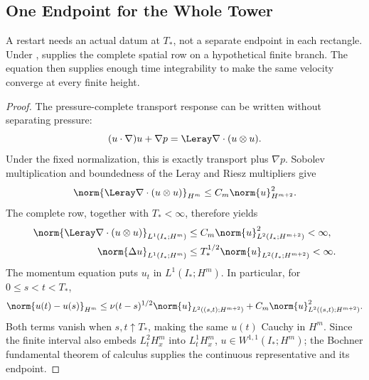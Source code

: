 \subsection{One Endpoint for the Whole Tower}\label{sub:OneEndpointForTheWholeTower}

A restart needs an actual datum at \(T_*\), not a separate endpoint in each
rectangle.  Under ,
 supplies the complete
spatial row on a hypothetical finite branch.  The equation then supplies
enough time integrability to make the same velocity converge at every finite
height.


\begin{proof}
The pressure-complete transport response can be written without separating
pressure:
\[
  (u\cdot\nabla)u+\nabla p
  =\Leray\nabla\cdot(u\otimes u).
\]
Under the fixed normalization, this is exactly transport plus \(\nabla p\).
Sobolev multiplication and boundedness of the Leray and Riesz multipliers give
\[
  \norm{\Leray\nabla\cdot(u\otimes u)}_{H^m}
  \leq
  C_m\norm{u}_{H^{m+2}}^2.
\]
The complete row, together with \(T_*<\infty\), therefore yields
\begin{align*}
  \norm{\Leray\nabla\cdot(u\otimes u)}_{L^1(I_*;H^m)}
  &\leq
  C_m\norm{u}_{L^2(I_*;H^{m+2})}^{2}
  <\infty,\\
  \norm{\Delta u}_{L^1(I_*;H^m)}
  &\leq
  T_*^{1/2}\norm{u}_{L^2(I_*;H^{m+2})}
  <\infty.
\end{align*}
The momentum equation puts \(u_t\) in \(L^1(I_*;H^m)\).  In particular, for
\(0\leq s<t<T_*\),
\[
  \norm{u(t)-u(s)}_{H^m}
  \leq
  \nu(t-s)^{1/2}\norm{u}_{L^2((s,t);H^{m+2})}
  +C_m\norm{u}_{L^2((s,t);H^{m+2})}^{2}.
\]
Both terms vanish when \(s,t\uparrow T_*\), making the same \(u(t)\) Cauchy
in \(H^m\).  Since the finite interval also embeds \(L^2_tH^m_x\) into
\(L^1_tH^m_x\), \(u\in W^{1,1}(I_*;H^m)\); the Bochner fundamental theorem of
calculus supplies the continuous representative and its endpoint.
\end{proof}

